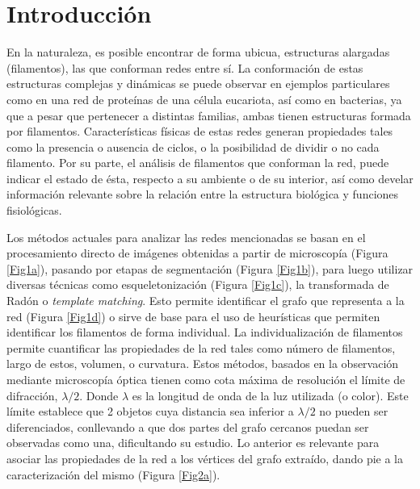 \chapter{Introducci\'on}
\label{chap:intro}

En la naturaleza, es posible encontrar de forma ubicua, estructuras alargadas (filamentos), las que conforman redes entre sí. La conformación de estas estructuras complejas y din\'amicas se puede observar en ejemplos particulares como en una red de prote\'inas de una c\'elula eucariota, as\'i como en bacterias, ya que a pesar que pertenecer a distintas familias, ambas tienen estructuras formada por filamentos. 
Caracter\'isticas f\'isicas de estas redes generan propiedades tales como la presencia o ausencia de ciclos, o la posibilidad de dividir o no cada filamento. Por su parte, el análisis de filamentos que conforman la red, puede indicar el estado de \'esta, respecto a su ambiente o de su interior, as\'i como develar informaci\'on relevante sobre la relaci\'on entre la estructura biol\'ogica y funciones fisiol\'ogicas.  
  
Los m\'etodos actuales para analizar las redes mencionadas se basan en el procesamiento directo de im\'agenes obtenidas a partir de microscop\'ia (Figura \ref{Fig1a}), pasando por etapas de segmentaci\'on (Figura \ref{Fig1b}), para luego utilizar diversas t\'ecnicas como esqueletonizaci\'on (Figura \ref{Fig1c}), la transformada de Rad\'on o {\it template matching}. Esto permite identificar el grafo que representa a la red (Figura \ref{Fig1d}) o sirve de base para el uso de heur\'isticas que permiten identificar los filamentos de forma individual.
La individualizaci\'on de filamentos permite cuantificar las propiedades de la red tales como n\'umero de filamentos, largo de estos, volumen, o curvatura. Estos m\'etodos, basados en la observaci\'on mediante microscop\'ia \'optica tienen como cota m\'axima de resoluci\'on el l\'imite de difracci\'on, $\lambda/2$. Donde $\lambda$ es la longitud de onda de la luz utilizada (o color). Este l\'imite establece que 2 objetos cuya distancia sea inferior a $\lambda/2$ no pueden ser diferenciados, conllevando a que dos partes del grafo cercanos puedan ser observadas como una, dificultando su estudio. Lo anterior es relevante para asociar las propiedades de la red a los v\'ertices del grafo extra\'ido, dando pie a la caracterizaci\'on del mismo (Figura \ref{Fig2a}).
 
